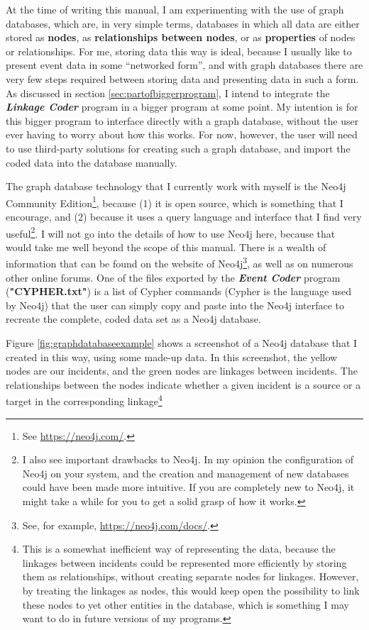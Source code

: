 \documentclass{memoir}
\begin{document}
At the time of writing this manual, I am experimenting with the use of graph databases, which are, in very simple terms, databases in which all data are either stored as \textbf{nodes}, as \textbf{relationships between nodes}, or as \textbf{properties} of nodes or relationships. For me, storing data this way is ideal, because I usually like to present event data in some ``networked form'', and with graph databases there are very few steps required between storing data and presenting data in such a form. As discussed in section \ref{sec:partofbiggerprogram}, I intend to integrate the \textbf{\emph{Linkage Coder}} program in a bigger program at some point. My intention is for this bigger program to interface directly with a graph database, without the user ever having to worry about how this works. For now, however, the user will need to use third-party solutions for creating such a graph database, and import the coded data into the database manually.

The graph database technology that I currently work with myself is the Neo4j Community Edition\footnote{See \url{https://neo4j.com/}.}, because (1) it is open source, which is something that I encourage, and (2) because it uses a query language and interface that I find very useful\footnote{I also see important drawbacks to Neo4j. In my opinion the configuration of Neo4j on your system, and the creation and management of new databases could have been made more intuitive. If you are completely new to Neo4j, it might take a while for you to get a solid grasp of how it works.}. I will not go into the details of how to use Neo4j here, because that would take me well beyond the scope of this manual. There is a wealth of information that can be found on the website of Neo4j\footnote{See, for example, \url{https://neo4j.com/docs/}.}, as well as on numerous other online forums. One of the files exported by the \emph{\textbf{Event Coder}} program (\textbf{"CYPHER.txt"}) is a list of Cypher commands (Cypher is the language used by Neo4j) that the user can simply copy and paste into the Neo4j interface to recreate the complete, coded data set as a Neo4j database.    

Figure \ref{fig:graphdatabaseexample} shows a screenshot of a Neo4j database that I created in this way, using some made-up data. In this screenshot, the yellow nodes are our incidents, and the green nodes are linkages between incidents. The relationships between the nodes indicate whether a given incident is a source or a target in the corresponding linkage\footnote{This is a somewhat inefficient way of representing the data, because the linkages between incidents could be represented more efficiently by storing them as relationships, without creating separate nodes for linkages. However, by treating the linkages as nodes, this would keep open the possibility to link these nodes to yet other entities in the database, which is something I may want to do in future versions of my programs.} 
\end{document}
